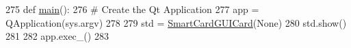 \begin{DoxyCode}
275 \textcolor{keyword}{def }\hyperlink{namespacesoftware_1_1chipwhisperer_1_1capture_1_1targets_1_1__smartcard__gui_a7e4449eea1ad1b24c502442bc4750b2b}{main}():
276     \textcolor{comment}{# Create the Qt Application}
277     app = QApplication(sys.argv)
278 
279     std = \hyperlink{classsoftware_1_1chipwhisperer_1_1capture_1_1targets_1_1__smartcard__gui_1_1SmartCardGUICard}{SmartCardGUICard}(\textcolor{keywordtype}{None})
280     std.show()
281 
282     app.exec\_()
283 
\end{DoxyCode}

